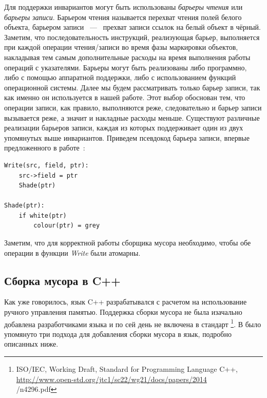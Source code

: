 Для поддержки инвариантов могут быть использованы \emph{барьеры чтения} или 
\emph{барьеры записи}. 
Барьером чтения называется перехват чтения полей белого объекта, барьером записи ~---~ 
прехват записи ссылок на белый объект в чёрный. 
Заметим, что последовательность инструкций, реализующая барьер, выполняется при каждой 
операции чтения/записи во время фазы маркировки объектов, накладывая тем самым дополнительные 
расходы на время выполнения работы операций с указателями. 
Барьеры могут быть реализованы либо программно, либо с помощью аппаратной поддержки, 
либо с использованием функций операционной системы. 
Далее мы будем рассматривать только барьер записи, так как именно он используется в нашей 
работе. 
Этот выбор обоснован тем, что операции записи, как правило, выполняются реже, следовательно 
и барьер записи вызывается реже, а значит и накладные расходы меньше. 
Существуют различные реализации барьеров записи, каждая из которых поддерживает один из двух 
упомянутых выше инвариантов. 
Приведем псевдокод барьера записи, впервые предложенного в работе~\cite{dijkstra1978fly}:

\begin{lstlisting}[caption={Dijkstra Barier}, label={code:write_barrier}]
Write(src, field, ptr):
    src->field = ptr
    Shade(ptr)
    
Shade(ptr):
    if white(ptr)
        colour(ptr) = grey
\end{lstlisting}

Заметим, что для корректной работы сборщика мусора необходимо, чтобы обе операции в функции 
\emph{Write} были атомарны. 


\subsection{Сборка мусора в C++}

Как уже говорилось, язык C++ разрабатывался с расчетом на использование ручного 
управления памятью. 
Поддержка сборки мусора не была изачально добавлена разработчиками языка и по сей день 
не включена в стандарт 
\footnote{ISO/IEC, Working Draft, Standard for Programming Language C++,
\url{http://www.open-std.org/jtc1/sc22/wg21/docs/papers/2014}\\{/n4296.pdf}}. 
В \cite{boehm2007transparent} было упомянуто три подхода для добавления сборки мусора в 
язык, подробно описанных ниже.


